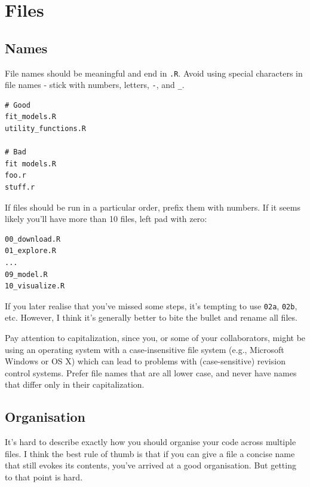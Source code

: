 \documentclass[twoside, pagesize, fontsize=11pt, dvipsnames]{scrreport} %
\begin{document}

\hypertarget{files}{%
\chapter{Files}\label{files}}

\hypertarget{names}{%
\section{Names}\label{names}}

File names should be meaningful and end in \texttt{.R}. Avoid using
special characters in file names - stick with numbers, letters,
\texttt{-}, and \texttt{\_}.

\begin{verbatim}
# Good
fit_models.R
utility_functions.R

# Bad
fit models.R
foo.r
stuff.r
\end{verbatim}

If files should be run in a particular order, prefix them with numbers.
If it seems likely you'll have more than 10 files, left pad with zero:

\begin{verbatim}
00_download.R
01_explore.R
...
09_model.R
10_visualize.R
\end{verbatim}

If you later realise that you've missed some steps, it's tempting to use
\texttt{02a}, \texttt{02b}, etc. However, I think it's generally better
to bite the bullet and rename all files.

Pay attention to capitalization, since you, or some of your
collaborators, might be using an operating system with a
case-insensitive file system (e.g., Microsoft Windows or OS X) which can
lead to problems with (case-sensitive) revision control systems. Prefer
file names that are all lower case, and never have names that differ
only in their capitalization.

\hypertarget{organisation}{%
\section{Organisation}\label{organisation}}

It's hard to describe exactly how you should organise your code across
multiple files. I think the best rule of thumb is that if you can give a
file a concise name that still evokes its contents, you've arrived at a
good organisation. But getting to that point is hard.
\end{document}
